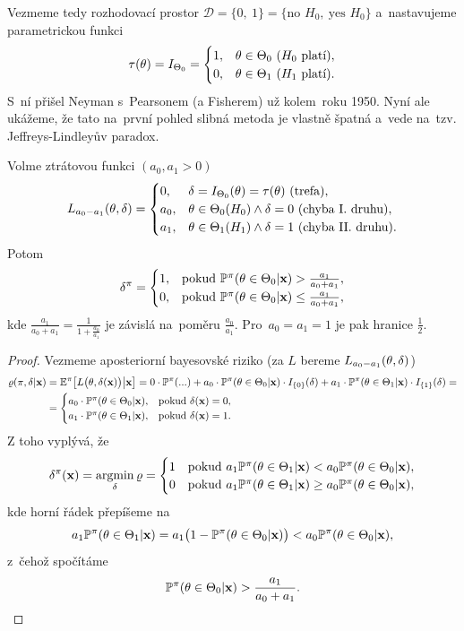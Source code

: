 Vezmeme tedy rozhodovací prostor $\mathscr{D}=\{0,~1\}=\{\text{no }H_0,~\text{yes }H_0\}$ a~nastavujeme parametrickou funkci
$$ \tau(\theta)=I_{\Theta_0}=\begin{cases}
1,& \theta\in\Theta_0~(H_0\text{ platí}),\\0,& \theta\in\Theta_1~(H_1\text{ platí}).
\end{cases}$$ S~ní přišel Neyman s~Pearsonem (a Fisherem) už kolem~roku 1950. Nyní ale ukážeme, že tato na~první pohled slibná metoda je vlastně špatná a~vede na~tzv. Jeffreys-Lindleyův paradox. 
\begin{theorem}
	Volme ztrátovou funkci $(a_0,a_1>0)$ $$L_{a_0-a_1}(\theta,\delta)=\begin{cases}
	0,&\delta=I_{\Theta_0}(\theta)=\tau(\theta)~(\text{trefa}),\\a_0,& \theta\in\Theta_0(H_0)\wedge \delta=0~(\text{chyba I. druhu}),\\a_1,& \theta\in\Theta_1(H_1)\wedge \delta=1~(\text{chyba II. druhu}).
	\end{cases}$$
	Potom $$\delta^\pi=\begin{cases}
	1,& \text{pokud }\mathbb{P}^\pi(\theta\in\Theta_0|\textbf{x})>\frac{a_1}{a_0+a_1},\\
	0,& \text{pokud }\mathbb{P}^\pi(\theta\in\Theta_0|\textbf{x})\leq\frac{a_1}{a_0+a_1},
	\end{cases}$$ kde $\frac{a_1}{a_0+a_1}=\frac{1}{1+\frac{a_0}{a_1}}$ je závislá na~poměru $\frac{a_0}{a_1}$. Pro~$a_0=a_1=1$ je pak hranice $\frac{1}{2}$.
	\begin{proof}
		Vezmeme aposteriorní bayesovské riziko (za $L$ bereme $L_{a_0-a_1}(\theta,\delta)$)
		\[
		\begin{split}
		\varrho(\pi,\delta|\textbf{x})&=\mathbb{E}^\pi\big[L\big(\theta,\delta(\textbf{x})\big)\big| \textbf{x}\big]=0\cdot\mathbb{P}^{\pi}(...)+a_0\cdot \mathbb{P}^\pi(\theta\in\Theta_0|\textbf{x})\cdot I_{\{0\}}(\delta)+a_1 \cdot\mathbb{P}^\pi (\theta\in\Theta_1|\textbf{x})\cdot I_{\{1\}}(\delta)=\\&=\begin{cases}
		a_0\cdot \mathbb{P}^\pi(\theta\in\Theta_0|\textbf{x}),&\text{pokud }\delta(\textbf{x})=0,\\
		a_1\cdot \mathbb{P}^\pi(\theta\in\Theta_1|\textbf{x}),&\text{pokud }\delta(\textbf{x})=1.
		\end{cases}
		\end{split}
		\]
		Z toho vyplývá, že
		$$ \delta^\pi(\textbf{x})=\mathop{\mathrm{argmin}}_\delta \varrho=\begin{cases}
		1&\text{pokud }a_1\mathbb{P}^\pi(\theta\in\Theta_1|\textbf{x})<a_0\mathbb{P}^\pi(\theta\in\Theta_0|\textbf{x}),\\
		0&\text{pokud }a_1\mathbb{P}^\pi(\theta\in\Theta_1|\textbf{x})\geq a_0\mathbb{P}^\pi(\theta\in\Theta_0|\textbf{x}),\\
		\end{cases} $$
		kde horní řádek přepíšeme na~$$a_1\mathbb{P}^\pi(\theta\in\Theta_1|\textbf{x})=a_1\big(1-\mathbb{P}^\pi(\theta\in\Theta_0|\textbf{x})\big)<a_0\mathbb{P}^\pi(\theta\in\Theta_0|\textbf{x}),$$ z~čehož spočítáme $$\mathbb{P}^\pi(\theta\in\Theta_0|\textbf{x})>\frac{a_1}{a_0+a_1}.$$
	\end{proof}
\end{theorem}
